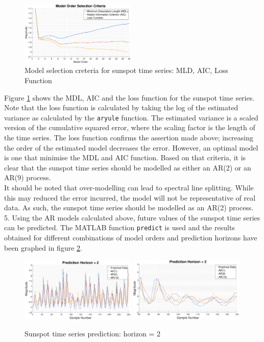 \documentclass{article}
\begin{document}
\begin{figure}[H]
    \centering
    \includegraphics[width = 0.49\textwidth]{MLD_AIC_loss_sunspot}
    \caption{Model selection creteria for sunspot time series: MLD, AIC, Loss Function}
    \label{fig:MLD_AIC_loss_sunspot}
\end{figure}

Figure \ref{fig:MLD_AIC_loss_sunspot} shows the MDL, AIC and the loss function for the sunspot time series. Note that the loss function is calculated by taking the log of the estimated variance as calculated by the {\tt aryule} function. The estimated variance is a scaled version of the cumulative squared error, where the scaling factor is the length of the time series. The loss function confirms the assertion made above; increasing the order of the estimated model decreases the error. However, an optimal model is one that minimise the MDL and AIC function. Based on that criteria, it is clear that the sunspot time series should be modelled as either an AR(2) or an AR(9) process.\\ 

It should be noted that over-modelling can lead to spectral line splitting. While this may reduced the error incurred, the model will not be representative of real data. As such, the sunspot time series should be modelled as an AR(2) process.\\

5. Using the AR models calculated above, future values of the sunspot time series can be predicted. The MATLAB function {\tt predict} is used and the results obtained for different combinations of model orders and prediction horizons have been graphed in figure \ref{fig:ar_prediction_1}.

\begin{figure}[H]
    \centering
    \includegraphics[width = 0.49\textwidth]{sunspot_prediction_horizon_2}
    \includegraphics[width = 0.49\textwidth]{sunspot_prediction_horizon_2_zoom}
    \caption{Sunspot time series prediction: horizon = 2}
    \label{fig:ar_prediction_1}
\end{figure}
\end{document}
